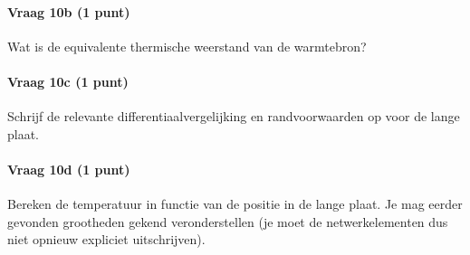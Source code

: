 \documentclass[a4paper]{article}
\begin{document}
\paragraph{Vraag 10b (1 punt)}
Wat is de equivalente thermische weerstand van de warmtebron?

\paragraph{Vraag 10c (1 punt)}
Schrijf de relevante differentiaalvergelijking en randvoorwaarden op voor de lange plaat.

\paragraph{Vraag 10d (1 punt)}
Bereken de temperatuur in functie van de positie in de lange plaat. Je mag eerder gevonden grootheden gekend veronderstellen (je moet de netwerkelementen dus niet opnieuw expliciet uitschrijven).
\end{document}
